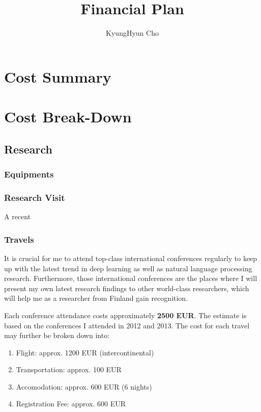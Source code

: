\documentclass[11pt, oneside]{essay}
\title{Financial Plan}
\author{KyungHyun Cho}
\begin{document}
\maketitle

\section{Cost Summary}



\section{Cost Break-Down}

\subsection{Research}

\subsubsection{Equipments}


\subsubsection{Research Visit}

A recent 



\subsubsection{Travels}

It is crucial for me to attend top-class international
conferences regularly to keep up with the latest trend in deep
learning as well as natural language processing research.
Furthermore, those international conferences are the places where
I will present my own latest research findings to other
world-class researchers, which will help me as a researcher from
Finland gain recognition.

Each conference attendance costs approximately \textbf{2500 EUR}.
The estimate is based on the conferences I attended in 2012 and
2013. The cost for each travel may further be broken down into:
\begin{enumerate}
    \item Flight: approx. 1200 EUR (intercontinental)
    \item Transportation: approx. 100 EUR
    \item Accomodation: approx. 600 EUR (6 nights)
    \item Registration Fee: approx. 600 EUR
\end{enumerate}
\end{document}
